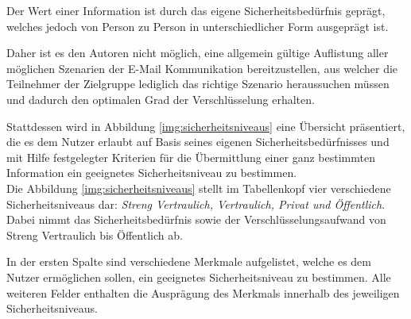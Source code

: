 \documentclass  [paper=a4,
				fontsize=12pt,
				listof=totoc,
				bibliography=totoc
				]{scrreprt}
\begin{document}
	
		Der Wert einer Information ist durch das eigene Sicherheitsbedürfnis geprägt, welches jedoch von Person zu Person in unterschiedlicher Form ausgeprägt ist.
		
		Daher ist es den Autoren nicht möglich, eine allgemein gültige Auflistung aller möglichen Szenarien der E-Mail Kommunikation bereitzustellen, aus welcher die Teilnehmer der Zielgruppe lediglich das richtige Szenario heraussuchen müssen und dadurch den optimalen Grad der Verschlüsselung erhalten. 
		
		Stattdessen wird in Abbildung \ref{img:sicherheitsniveaus} eine Übersicht präsentiert, die es dem Nutzer erlaubt auf Basis seines eigenen Sicherheitsbedürfnisses und mit Hilfe festgelegter Kriterien für die Übermittlung einer ganz bestimmten Information ein geeignetes Sicherheitsniveau zu bestimmen. 
		\medskip\\
		
		
	
		
		Die Abbildung \ref{img:sicherheitsniveaus} stellt im Tabellenkopf vier verschiedene Sicherheitsniveaus dar: \textit{Streng Vertraulich, Vertraulich, Privat und Öffentlich}. Dabei nimmt das Sicherheitsbedürfnis sowie der Verschlüsselungsaufwand von Streng Vertraulich bis Öffentlich ab.
		
		In der ersten Spalte sind verschiedene Merkmale aufgelistet, welche es dem Nutzer ermöglichen sollen, 
		ein geeignetes Sicherheitsniveau zu bestimmen.
		Alle weiteren Felder enthalten die Ausprägung des Merkmals innerhalb des jeweiligen Sicherheitsniveaus.
		\medskip\\
		
\end{document}
